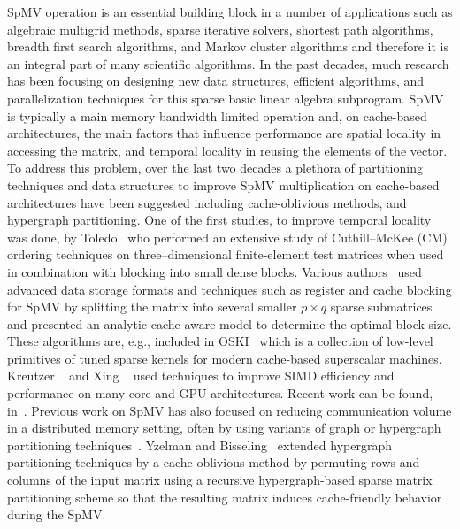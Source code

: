 \Acrfull{SpMV} operation  is an essential building block 
in a number of applications such as algebraic multigrid methods, 
sparse iterative solvers, shortest path algorithms, breadth first search algorithms, 
and Markov cluster algorithms and therefore it is an integral part 
of many scientific algorithms.
In the past decades, much research has been
focusing on designing new data structures, efficient algorithms, and
parallelization  techniques for this sparse basic linear algebra
subprogram.  \acrshort{SpMV} is typically a main memory bandwidth limited operation and, on
cache-based architectures, the main factors that influence performance
are spatial locality in accessing the matrix, and temporal locality in
reusing the elements of the vector. To address this problem, over the
last two decades a plethora of  partitioning techniques
and data structures to improve \acrshort{SpMV} multiplication on cache-based
architectures have been suggested including %
cache-oblivious methods, and hypergraph partitioning. One
of the first studies, \eg to improve temporal locality was done, \eg
by Toledo~\cite{Toledo:1997:IMP:279511.279532} who performed an
extensive study of Cuthill--McKee (CM) ordering
techniques on three--dimensional finite-element test matrices when
used in combination with blocking into small dense blocks. Various
authors~\cite{Williams:2009:OSM:1513001.1513318,doi:10.1177/1094342004041296}
used advanced data storage formats and techniques such as register and cache blocking  for  
\acrshort{SpMV} by splitting the matrix into several smaller $p \times
q$ sparse submatrices and presented an analytic cache-aware model to
determine the optimal block size. These algorithms are, e.g.,
included in OSKI~\cite{1742-6596-16-1-071} which is a collection of
low-level primitives of tuned sparse kernels for modern cache-based
superscalar machines. Kreutzer \etal~\cite{Moritz_sell} and 
Xing \etal~\cite{Liu:2013:ESM:2464996.2465013} used techniques to 
improve SIMD efficiency and performance on many-core and GPU architectures. 
Recent work can be found, \eg
in~\cite{li2017hbm,Liu:2015:CES:2751205.2751209,liu2015spmv}.
 Previous work on  \acrshort{SpMV}  has also focused on reducing
 communication volume in a distributed memory setting, often by using
 variants of graph or hypergraph partitioning
 techniques~\cite{Catalyurek:1999}. Yzelman and
 Bisseling~\cite{doi:10.1137/080733243,Yzelman-thesis-2011} extended
 hypergraph partitioning techniques by a cache-oblivious method by
 permuting rows and columns of the input matrix using a recursive
 hypergraph-based sparse matrix partitioning scheme so that the
 resulting matrix induces cache-friendly behavior during the
 \acrshort{SpMV}.

